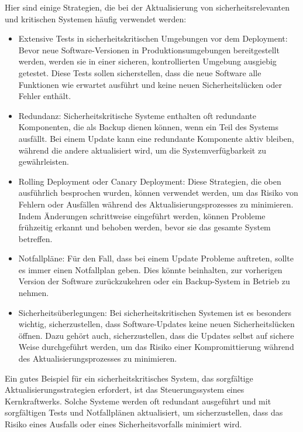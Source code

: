 Hier sind einige Strategien, die bei der Aktualisierung von sicherheitsrelevanten und kritischen Systemen häufig verwendet werden:
\begin{itemize} 
\item Extensive Tests in sicherheitskritischen Umgebungen vor dem Deployment: Bevor neue Software-Versionen in Produktionsumgebungen bereitgestellt werden, werden sie in einer sicheren, kontrollierten Umgebung ausgiebig getestet. Diese Tests sollen sicherstellen, dass die neue Software alle Funktionen wie erwartet ausführt und keine neuen Sicherheitslücken oder Fehler enthält.

\item Redundanz: Sicherheitskritische Systeme enthalten oft redundante Komponenten, die als Backup dienen können, wenn ein Teil des Systems ausfällt. Bei einem Update kann eine redundante Komponente aktiv bleiben, während die andere aktualisiert wird, um die Systemverfügbarkeit zu gewährleisten.

\item Rolling Deployment oder Canary Deployment: Diese Strategien, die oben ausführlich besprochen wurden, können verwendet werden, um das Risiko von Fehlern oder Ausfällen während des Aktualisierungsprozesses zu minimieren. Indem Änderungen schrittweise eingeführt werden, können Probleme frühzeitig erkannt und behoben werden, bevor sie das gesamte System betreffen.

\item  Notfallpläne: Für den Fall, dass bei einem Update Probleme auftreten, sollte es immer einen Notfallplan geben. Dies könnte beinhalten, zur vorherigen Version der Software zurückzukehren oder ein Backup-System in Betrieb zu nehmen.

\item Sicherheitsüberlegungen: Bei sicherheitskritischen Systemen ist es besonders wichtig, sicherzustellen, dass Software-Updates keine neuen Sicherheitslücken öffnen. Dazu gehört auch, sicherzustellen, dass die Updates selbst auf sichere Weise durchgeführt werden, um das Risiko einer Kompromittierung während des Aktualisierungsprozesses zu minimieren.
\end{itemize} 
Ein gutes Beispiel für ein sicherheitskritisches System, das sorgfältige Aktualisierungsstrategien erfordert, ist das Steuerungssystem eines Kernkraftwerks. Solche Systeme werden oft redundant ausgeführt und mit sorgfältigen Tests und Notfallplänen aktualisiert, um sicherzustellen, dass das Risiko eines Ausfalls oder eines Sicherheitsvorfalls minimiert wird. 
